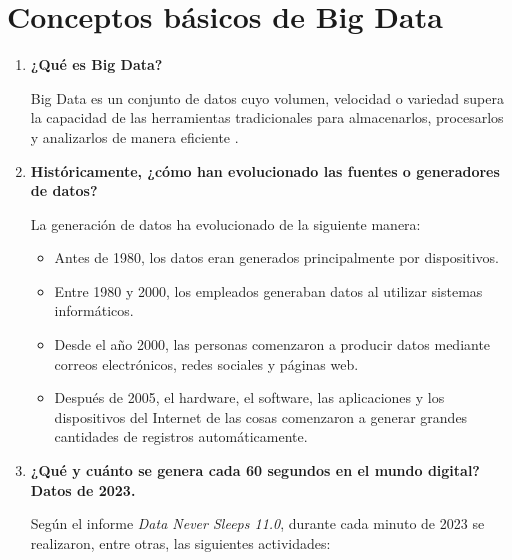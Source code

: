 
\section{Conceptos básicos de Big Data}

\begin{enumerate}

\item \textbf{¿Qué es Big Data?}

Big Data es un conjunto de datos cuyo volumen, velocidad o variedad supera la capacidad de las herramientas tradicionales para almacenarlos, procesarlos y analizarlos de manera eficiente .

\item \textbf{Históricamente, ¿cómo han evolucionado las fuentes o generadores de datos?}

La generación de datos ha evolucionado de la siguiente manera:

\begin{itemize}
    \item Antes de 1980, los datos eran generados principalmente por dispositivos.
    \item Entre 1980 y 2000, los empleados generaban datos al utilizar sistemas informáticos.
    \item Desde el año 2000, las personas comenzaron a producir datos mediante correos electrónicos, redes sociales y páginas web.
    \item Después de 2005, el hardware, el software, las aplicaciones y los dispositivos del Internet de las cosas comenzaron a generar grandes cantidades de registros automáticamente.
\end{itemize}

\item \textbf{¿Qué y cuánto se genera cada 60 segundos en el mundo digital? Datos de 2023.}

Según el informe \textit{Data Never Sleeps 11.0}, durante cada minuto de 2023 se realizaron, entre otras, las siguientes actividades:


\end{enumerate}
